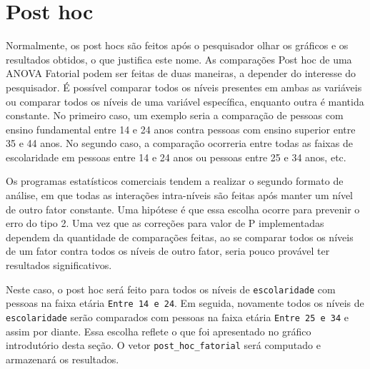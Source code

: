 \documentclass[
]{book}
\newenvironment{Shaded}{\begin{snugshade}}{\end{snugshade}}
\newcommand{\DataTypeTok}[1]{\textcolor[rgb]{0.13,0.29,0.53}{#1}}
\newcommand{\KeywordTok}[1]{\textcolor[rgb]{0.13,0.29,0.53}{\textbf{#1}}}
\newcommand{\NormalTok}[1]{#1}
\newcommand{\OperatorTok}[1]{\textcolor[rgb]{0.81,0.36,0.00}{\textbf{#1}}}
\newcommand{\StringTok}[1]{\textcolor[rgb]{0.31,0.60,0.02}{#1}}
\begin{document}
\hypertarget{post-hoc-2}{%
\section{Post hoc}\label{post-hoc-2}}

Normalmente, os post hocs são feitos após o pesquisador olhar os
gráficos e os resultados obtidos, o que justifica este nome. As
comparações Post hoc de uma ANOVA Fatorial podem ser feitas de duas
maneiras, a depender do interesse do pesquisador. É possível comparar
todos os níveis presentes em ambas as variáveis ou comparar todos os
níveis de uma variável específica, enquanto outra é mantida constante.
No primeiro caso, um exemplo seria a comparação de pessoas com ensino
fundamental entre 14 e 24 anos contra pessoas com ensino superior entre
35 e 44 anos. No segundo caso, a comparação ocorreria entre todas as
faixas de escolaridade em pessoas entre 14 e 24 anos ou pessoas entre 25
e 34 anos, etc.

Os programas estatísticos comerciais tendem a realizar o segundo formato
de análise, em que todas as interações intra-níveis são feitas após
manter um nível de outro fator constante. Uma hipótese é que essa
escolha ocorre para prevenir o erro do tipo 2. Uma vez que as correções
para valor de P implementadas dependem da quantidade de comparações
feitas, ao se comparar todos os níveis de um fator contra todos os
níveis de outro fator, seria pouco provável ter resultados
significativos.

Neste caso, o post hoc será feito para todos os níveis de
\texttt{escolaridade} com pessoas na faixa etária
\texttt{Entre\ 14\ e\ 24}. Em seguida, novamente todos os níveis de
\texttt{escolaridade} serão comparados com pessoas na faixa etária
\texttt{Entre\ 25\ e\ 34} e assim por diante. Essa escolha reflete o que
foi apresentado no gráfico introdutório desta seção. O vetor
\texttt{post\_hoc\_fatorial} será computado e armazenará os resultados.

\begin{Shaded}
\end{Shaded}
\end{document}
